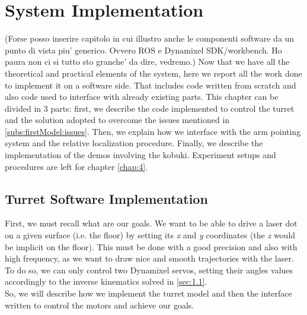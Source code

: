 \chapter{System Implementation}\label{chap:3}
(Forse posso inserire capitolo in cui illustro anche le componenti software da un punto di vista piu' generico. Ovvero ROS e Dynamixel SDK/workbench. Ho paura non ci si tutto sto granche' da dire, vedremo.)
Now that we have all the theoretical and practical elements of the system, here we report all the work done to implement it on a software side. That includes code written from scratch and also code used to interface with already existing parts. This chapter can be divided in 3 parts: first, we describe the code implemented to control the turret and the solution adopted to overcome the issues mentioned in \ref{subs:firstModel:issues}. Then, we explain how we interface with the arm pointing system and the relative localization procedure. Finally, we describe the implementation of the demos involving the kobuki. Experiment setups and procedures are left for chapter \ref{chap:4}.
\section{Turret Software Implementation}
First, we must recall what are our goals. We want to be able to drive a laser dot on a given surface (i.e. the floor) by setting its \emph{x} and \emph{y} coordinates (the \emph{z} would be implicit on the floor). This must be done with a good precision and also with high frequency, as we want to draw nice and smooth trajectories with the laser. To do so, we can only control two Dynamixel servos, setting their angles values accordingly to the inverse kinematics solved in \ref{sec:1.1}.\\
So, we will describe how we implement the turret model and then the interface written to control the motors and achieve our goals.
